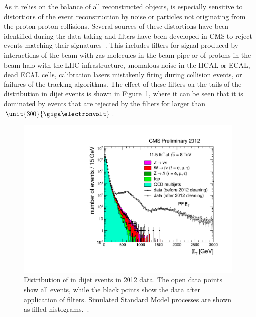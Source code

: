 As it relies on the balance of all reconstructed objects, \MET is especially sensitive to distortions of the event reconstruction by noise or particles not originating from the proton proton collisions. Several sources of these distortions have been identified during the data taking and filters have been developed in CMS to reject events matching their signatures~\cite{CMS-PAS-JME-12-002}. This includes filters for signal produced by interactions of the beam with gas molecules in the beam pipe or of protons in the beam halo with the LHC infrastructure, anomalous noise in the HCAL or ECAL, dead ECAL cells, calibration lasers mistakenly firing during collision events, or failures of the tracking algorithms. The effect of these filters on the tails of the \MET distribution in dijet events is shown in Figure~\ref{fig:METFilters}, where it can be seen that it is dominated by events that are rejected by the filters for \MET larger than $\unit{300}{\giga\electronvolt}$.
\begin{figure}
\begin{center}
\includegraphics[scale=0.4]{plots/SELECTION/metFilter.pdf}
\caption{Distribution of \MET in dijet events in 2012 data. The open data points show all events, while the black points show the data after application of \MET filters. Simulated Standard Model processes are shown as filled histograms.~\cite{CMS-PAS-JME-12-002}.}
\label{fig:METFilters}
\end{center}
\end{figure}


